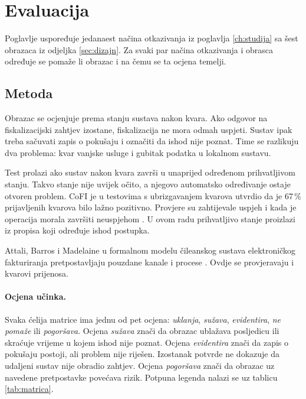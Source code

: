 \section{Evaluacija}
\label{ch:evaluacija}

Poglavlje uspoređuje jedanaest načina otkazivanja iz
poglavlja \ref{ch:studija} sa šest obrazaca iz odjeljka \ref{sec:dizajn}.
Za svaki par načina otkazivanja i obrasca određuje se pomaže li obrazac i
na čemu se ta ocjena temelji.

\subsection{Metoda}
\label{sec:metoda-evaluacije}

Obrazac se ocjenjuje prema stanju sustava nakon kvara. Ako odgovor na
fiskalizacijski zahtjev izostane, fiskalizacija ne mora odmah uspjeti. Sustav
ipak treba sačuvati zapis o pokušaju i označiti da ishod nije poznat. Time se
razlikuju dva problema: kvar vanjske usluge i gubitak podatka u lokalnom
sustavu.

Test prolazi ako sustav nakon kvara završi u unaprijed određenom prihvatljivom
stanju. Takvo stanje nije uvijek očito, a njegovo automatsko određivanje
ostaje otvoren problem. CoFI je u testovima s ubrizgavanjem kvarova utvrdio
da je 67\,\% prijavljenih kvarova bilo lažno pozitivno.
Provjere su zahtijevale uspjeh i kada je operacija morala završiti neuspjehom
\cite{chen2020cofi}. U ovom radu prihvatljivo stanje proizlazi iz propisa koji
određuje ishod postupka.

Attali, Barros i Madelaine u formalnom modelu čileanskog sustava
elektroničkog fakturiranja pretpostavljaju pouzdane kanale i procese
\cite{attali2004chilean}. Ovdje se provjeravaju i kvarovi prijenosa.

\paragraph{Ocjena učinka.}
Svaka ćelija matrice ima jednu od pet ocjena: \emph{uklanja}, \emph{sužava},
\emph{evidentira}, \emph{ne pomaže} ili \emph{pogoršava}. Ocjena
\emph{sužava} znači da obrazac ublažava posljedicu ili skraćuje vrijeme u
kojem ishod nije poznat. Ocjena \emph{evidentira} znači da zapis o pokušaju
postoji, ali problem nije riješen. Izostanak potvrde ne dokazuje da udaljeni
sustav nije obradio zahtjev. Ocjena \emph{pogoršava} znači da obrazac uz
navedene pretpostavke povećava rizik. Potpuna legenda nalazi se uz tablicu
\ref{tab:matrica}.

